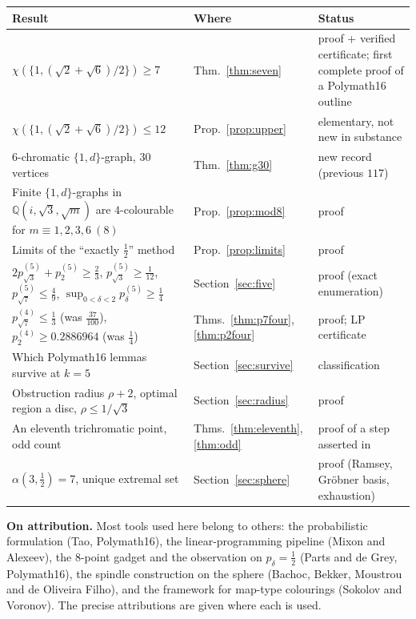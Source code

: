 \documentclass[11pt,a4paper]{amsart}
\theoremstyle{remark}
\newcommand{\Q}{\mathbb{Q}}
\begin{document}
\begin{center}
\small
\begin{tabular}{p{6.2cm}p{2.6cm}p{4.6cm}}
\toprule
Result & Where & Status\\
\midrule
$\chi(\{1,(\sqrt2+\sqrt6)/2\})\ge7$ & Thm.~\ref{thm:seven} & proof + verified certificate; first complete proof of a Polymath16 outline\\
$\chi(\{1,(\sqrt2+\sqrt6)/2\})\le12$ & Prop.~\ref{prop:upper} & elementary, not new in substance\\
$6$-chromatic $\{1,d\}$-graph, $30$ vertices & Thm.~\ref{thm:g30} & new record (previous $117$)\\
Finite $\{1,d\}$-graphs in $\Q(i,\sqrt3,\sqrt m)$ are $4$-colourable for $m\equiv1,2,3,6\ (8)$ & Prop.~\ref{prop:mod8} & proof\\
Limits of the ``exactly $\tfrac12$'' method & Prop.~\ref{prop:limits} & proof\\
$2p^{(5)}_{\sqrt3}+p^{(5)}_2\ge\frac23$, $p^{(5)}_{\sqrt3}\ge\frac1{12}$, $p^{(5)}_{\sqrt7}\le\frac49$, $\sup_{0<\delta<2}p^{(5)}_\delta\ge\frac14$ & Section~\ref{sec:five} & proof (exact enumeration)\\
$p^{(4)}_{\sqrt7}\le\frac13$ (was $\frac{37}{100}$), $p^{(4)}_2\ge0.2886964$ (was $\frac14$) & Thms.~\ref{thm:p7four}, \ref{thm:p2four} & proof; LP certificate\\
Which Polymath16 lemmas survive at $k=5$ & Section~\ref{sec:survive} & classification\\
Obstruction radius $\rho+2$, optimal region a disc, $\rho\le1/\sqrt3$ & Section~\ref{sec:radius} & proof\\
An eleventh trichromatic point, odd count & Thms.~\ref{thm:eleventh}, \ref{thm:odd} & proof of a step asserted in~\cite{SV26,Vo24}\\
$\alpha(3,\frac12)=7$, unique extremal set & Section~\ref{sec:sphere} & proof (Ramsey, Gr\"obner basis, exhaustion)\\
\bottomrule
\end{tabular}
\end{center}

\medskip
\noindent\textbf{On attribution.} Most tools used here belong to others: the probabilistic formulation (Tao, Polymath16), the linear-programming pipeline (Mixon and Alexeev), the $8$-point gadget and the observation on $p_\delta=\tfrac12$ (Parts and de Grey, Polymath16), the spindle construction on the sphere (Bachoc, Bekker, Moustrou and de Oliveira Filho), and the framework for map-type colourings (Sokolov and Voronov). The precise attributions are given where each is used.
\end{document}

